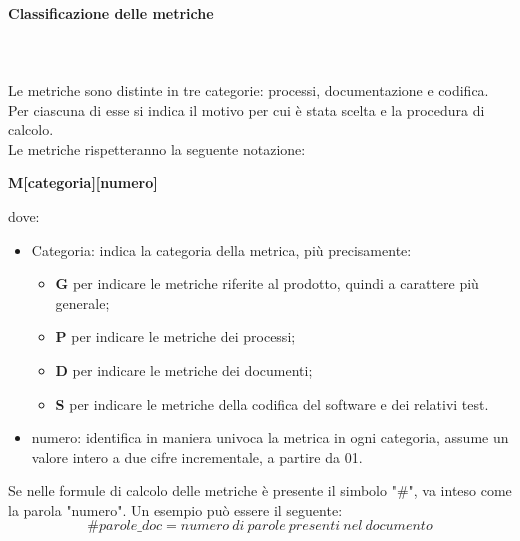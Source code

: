 \paragraph{Classificazione delle metriche} \mbox{} \\  \mbox{} \\ 
Le metriche sono distinte in tre categorie: processi, documentazione e codifica. Per ciascuna di esse si indica il motivo per cui è stata scelta e la procedura di calcolo.  \\
Le metriche rispetteranno la seguente notazione: \\
\centerline{\textbf{M[categoria][numero]}}
dove: \begin{itemize}
\item Categoria: indica la categoria della metrica, più precisamente:
\begin{itemize}
\item \textbf{G} per indicare le metriche riferite al prodotto, quindi a carattere più generale;
\item \textbf{P} per indicare le metriche dei processi;
\item \textbf{D} per indicare le metriche dei documenti;
\item \textbf{S} per indicare le metriche della codifica del software e dei relativi test.
\end{itemize}
\item numero: identifica in maniera univoca la metrica in ogni categoria, assume un valore intero a due cifre incrementale, a partire da 01.
\end{itemize}
Se nelle formule di calcolo delle metriche è presente il simbolo "\#", va inteso come la parola "numero". Un esempio può essere il seguente:
\[ \#parole\_doc = numero\ di\ parole\ presenti\ nel\ documento \]

